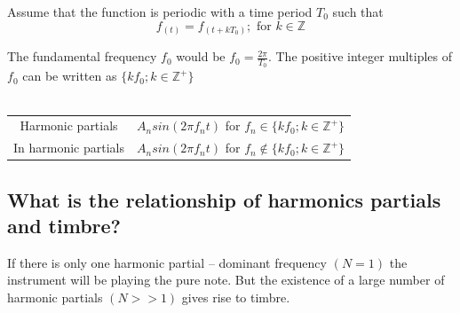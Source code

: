 \documentclass{article}
\begin{document}
Assume that the function is periodic with a time period $T_0$ such that $$f_{(t)}=f_{(t+kT_0)} ; \textrm{ for } k \in \mathbb{Z} $$ 

The fundamental frequency $f_0$ would be $f_0 = \frac{2\pi}{T_0}$. The positive integer multiples of $f_0$ can be written as $\{kf_0 ; k \in \mathbb{Z}^+ \}$
\\ \\
\begin{center}
    
\begin{tabular}{c|c}
\hline
     Harmonic partials& $A_n sin(2\pi f_n t)$ for  $f_n \in \{kf_0 ; k \in \mathbb{Z}^+ \}$\\
    In harmonic partials& $A_n sin(2\pi f_n t)$ for  $f_n \notin \{kf_0 ; k \in \mathbb{Z}^+ \}$\\
\end{tabular}
\end{center}


\subsection{What is the relationship of harmonics partials and timbre?}
If there is only one harmonic partial -- dominant frequency $(N=1)$ the instrument will be playing the pure note. But the existence of a large number of harmonic partials $(N >> 1)$ gives rise to timbre.








\end{document}
